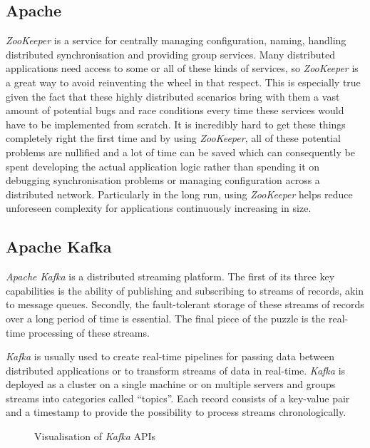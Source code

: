 \subsection{Apache }
\label{sec:background-zookeeper}

\textit{ZooKeeper} is a service for centrally managing configuration, naming, handling distributed
synchronisation and providing group services. Many distributed applications need access to some or
all of these kinds of services, so \textit{ZooKeeper} is a great way to avoid reinventing the wheel
in that respect. This is especially true given the fact that these highly distributed scenarios
bring with them a vast amount of potential bugs and race conditions every time these services would
have to be implemented from scratch. It is incredibly hard to get these things completely right the
first time and by using \textit{ZooKeeper}, all of these potential problems are nullified and a lot
of time can be saved which can consequently be spent developing the actual application logic rather
than spending it on debugging synchronisation problems or managing configuration across a
distributed network. Particularly in the long run, using \textit{ZooKeeper} helps reduce unforeseen
complexity for applications continuously increasing in size.
\cite{zookeeper-homepage}

\subsection{Apache Kafka}
\label{sec:background-kafka}

\textit{Apache Kafka} is a distributed streaming platform. The first of its three key capabilities
is the ability of publishing and subscribing to streams of records, akin to message queues.
Secondly, the fault-tolerant storage of these streams of records over a long period of time is
essential. The final piece of the puzzle is the real-time processing of these streams.

\textit{Kafka} is usually used to create real-time pipelines for passing data between distributed
applications or to transform streams of data in real-time. \textit{Kafka} is deployed as a cluster
on a single machine or on multiple servers and groups streams into categories called “topics”. Each
record consists of a key-value pair and a timestamp to provide the possibility to process streams
chronologically.

\begin{figure}[H]
  \centering
  \caption{Visualisation of \textit{Kafka} APIs \cite{kafka-complete-introduction}}
  \label{fig:kafka-apis}
\end{figure}

